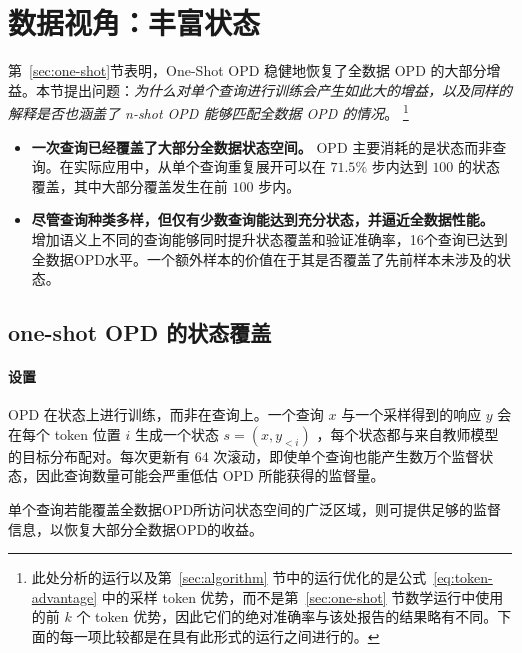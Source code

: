 \section{数据视角：丰富状态}
\label{sec:data}

第~\ref{sec:one-shot}节表明，One-Shot OPD 稳健地恢复了全数据 OPD 的大部分增益。本节提出问题：\textit{为什么对单个查询进行训练会产生如此大的增益，以及同样的解释是否也涵盖了 n-shot OPD 能够匹配全数据 OPD 的情况}。 \footnote{此处分析的运行以及第~\ref{sec:algorithm} 节中的运行优化的是公式~\ref{eq:token-advantage} 中的采样 token 优势，而不是第~\ref{sec:one-shot} 节数学运行中使用的前 \(k\) 个 token 优势，因此它们的绝对准确率与该处报告的结果略有不同。下面的每一项比较都是在具有此形式的运行之间进行的。}

\begin{tcolorbox}[takeawaysbox]
\begin{itemize}[topsep=0pt, partopsep=0pt, leftmargin=12pt, itemsep=0pt]
    \item  \textbf{一次查询已经覆盖了大部分全数据状态空间。}
OPD 主要消耗的是状态而非查询。在实际应用中，从单个查询重复展开可以在 \(71.5\%\)  步内达到 \(100\)  的状态覆盖，其中大部分覆盖发生在前 \(100\)  步内。

    \item  \textbf{尽管查询种类多样，但仅有少数查询能达到充分状态，并逼近全数据性能。} 增加语义上不同的查询能够同时提升状态覆盖和验证准确率，16个查询已达到全数据OPD水平。一个额外样本的价值在于其是否覆盖了先前样本未涉及的状态。
\end{itemize}
\end{tcolorbox}

\subsection{one-shot OPD 的状态覆盖}
\label{sec:state-coverage}

\paragraph{设置}
OPD 在状态上进行训练，而非在查询上。一个查询 \(x\) 与一个采样得到的响应 \(y\) 会在每个 token 位置 \(i\) 生成一个状态 \(s=(x,y_{<i})\) ，每个状态都与来自教师模型的目标分布配对。每次更新有 \(64\)  次滚动，即使单个查询也能产生数万个监督状态，因此查询数量可能会严重低估 OPD 所能获得的监督量。

\begin{tcolorbox}[examplebox, title={Hypothesis}]
单个查询若能覆盖全数据OPD所访问状态空间的广泛区域，则可提供足够的监督信息，以恢复大部分全数据OPD的收益。
\end{tcolorbox}

